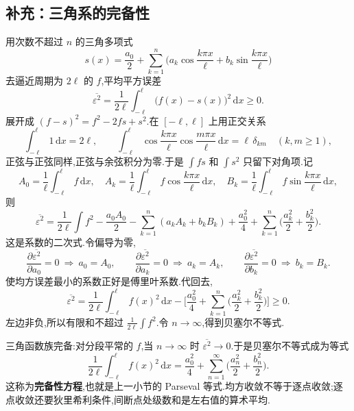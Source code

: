 \subsection*{补充：三角系的完备性}
用次数不超过 $n$ 的三角多项式
\begin{equation}
  s(x)
  =\frac{a_0}{2}
  +\sum_{k=1}^{n}
    \Biggl(
      a_k\cos\frac{k\pi x}{\ell}
      +b_k\sin\frac{k\pi x}{\ell}
    \Biggr)
\end{equation}
去逼近周期为 $2\ell$ 的 $f$,平均平方误差
\begin{equation}
  \overline{\varepsilon^2}
  =\frac{1}{2\ell}\int_{-\ell}^{\ell}\bigl(f(x)-s(x)\bigr)^2\,\mathrm{d}x
  \geq 0.
\end{equation}
展开成 $(f-s)^2=f^2-2fs+s^2$.在 $[-\ell,\ell]$ 上用正交关系
\begin{equation}
  \int_{-\ell}^{\ell}1\,\mathrm{d}x=2\ell,
  \qquad
  \int_{-\ell}^{\ell}\cos\frac{k\pi x}{\ell}\cos\frac{m\pi x}{\ell}\,\mathrm{d}x
  =\ell\,\delta_{km}
  \quad(k,m\geq 1),
\end{equation}
正弦与正弦同样,正弦与余弦积分为零.于是 $\int fs$ 和 $\int s^2$ 只留下对角项.记
\begin{equation}
  A_0=\frac{1}{\ell}\int_{-\ell}^{\ell}f\,\mathrm{d}x,
  \quad
  A_k=\frac{1}{\ell}\int_{-\ell}^{\ell}f\cos\frac{k\pi x}{\ell}\,\mathrm{d}x,
  \quad
  B_k=\frac{1}{\ell}\int_{-\ell}^{\ell}f\sin\frac{k\pi x}{\ell}\,\mathrm{d}x,
\end{equation}
则
\begin{equation}
  \overline{\varepsilon^2}
  =\frac{1}{2\ell}\int f^2
   -\frac{a_0 A_0}{2}
   -\sum_{k=1}^{n}(a_k A_k+b_k B_k)
   +\frac{a_0^2}{4}
   +\sum_{k=1}^{n}\Biggl(\frac{a_k^2}{2}+\frac{b_k^2}{2}\Biggr).
\end{equation}
这是系数的二次式.令偏导为零,
\begin{equation}
  \frac{\partial\overline{\varepsilon^2}}{\partial a_0}=0
  \ \Rightarrow\ a_0=A_0,
  \qquad
  \frac{\partial\overline{\varepsilon^2}}{\partial a_k}=0
  \ \Rightarrow\ a_k=A_k,
  \qquad
  \frac{\partial\overline{\varepsilon^2}}{\partial b_k}=0
  \ \Rightarrow\ b_k=B_k.
\end{equation}
使均方误差最小的系数正好是傅里叶系数.代回去,
\begin{equation}
  \overline{\varepsilon^2}
  =\frac{1}{2\ell}\int_{-\ell}^{\ell} f(x)^2\,\mathrm{d}x
   -\Biggl[
     \frac{a_0^2}{4}
     +\sum_{k=1}^{n}
       \Biggl(\frac{a_k^2}{2}+\frac{b_k^2}{2}\Biggr)
   \Biggr]
  \geq 0.
\end{equation}
左边非负,所以有限和不超过 $\frac{1}{2\ell}\int f^2$.令 $n\to\infty$,得到贝塞尔不等式.

三角函数族完备:对分段平常的 $f$,当 $n\to\infty$ 时 $\overline{\varepsilon^2}\to 0$.于是贝塞尔不等式成为等式
\begin{equation}
  \frac{1}{2\ell}\int_{-\ell}^{\ell} f(x)^2\,\mathrm{d}x
  =\frac{a_0^2}{4}
   +\sum_{n=1}^{\infty}\Biggl(\frac{a_n^2}{2}+\frac{b_n^2}{2}\Biggr).
\end{equation}
这称为\textbf{完备性方程},也就是上一小节的 Parseval 等式.均方收敛不等于逐点收敛;逐点收敛还要狄里希利条件,间断点处级数和是左右值的算术平均.